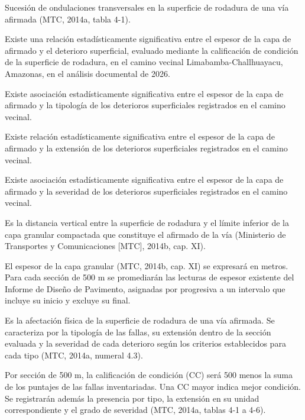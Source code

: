 \documentclass[12pt,a4paper]{article}
\begin{document}
Sucesión de ondulaciones transversales en la superficie de rodadura de una vía afirmada (MTC, 2014a, tabla 4-1).


Existe una relación estadísticamente significativa entre el espesor de la capa de afirmado y el deterioro superficial, evaluado mediante la calificación de condición de la superficie de rodadura, en el camino vecinal Limabamba-Challhuayacu, Amazonas, en el análisis documental de 2026.

\begin{listaTrasTitulo}
\item Existe asociación estadísticamente significativa entre el espesor de la capa de afirmado y la tipología de los deterioros superficiales registrados en el camino vecinal.
\item Existe relación estadísticamente significativa entre el espesor de la capa de afirmado y la extensión de los deterioros superficiales registrados en el camino vecinal.
\item Existe asociación estadísticamente significativa entre el espesor de la capa de afirmado y la severidad de los deterioros superficiales registrados en el camino vecinal.
\end{listaTrasTitulo}

Es la distancia vertical entre la superficie de rodadura y el límite inferior de la capa granular compactada que constituye el afirmado de la vía (Ministerio de Transportes y Comunicaciones [MTC], 2014b, cap. XI).

El espesor de la capa granular (MTC, 2014b, cap. XI) se expresará en metros. Para cada sección de 500 m se promediarán las lecturas de espesor existente del Informe de Diseño de Pavimento, asignadas por progresiva a un intervalo que incluye su inicio y excluye su final.

Es la afectación física de la superficie de rodadura de una vía afirmada. Se caracteriza por la tipología de las fallas, su extensión dentro de la sección evaluada y la severidad de cada deterioro según los criterios establecidos para cada tipo (MTC, 2014a, numeral 4.3).

Por sección de 500 m, la calificación de condición (CC) será 500 menos la suma de los puntajes de las fallas inventariadas. Una CC mayor indica mejor condición. Se registrarán además la presencia por tipo, la extensión en su unidad correspondiente y el grado de severidad (MTC, 2014a, tablas 4-1 a 4-6).
\end{document}
